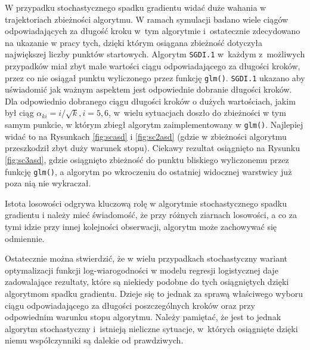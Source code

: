 W przypadku stochastycznego spadku gradientu widać duże wahania w trajektoriach zbieżności algorytmu. W ramach symulacji badano wiele ciągów odpowiadających za długość kroku w~tym algorytmie i~ostatecznie zdecydowano na ukazanie w pracy tych, dzięki którym osiągana zbieżność dotyczyła największej liczby punktów startowych. Algorytm \texttt{SGDI.1} w~każdym z~możliwych przypadków miał zbyt małe wartości ciągu odpowiadającego za długości kroków, przez co nie osiągał punktu wyliczonego przez funkcję \texttt{glm()}. \texttt{SGDI.1} ukazano aby uświadomić jak ważnym aspektem jest odpowiednie dobranie długości kroków. Dla odpowiednio dobranego ciągu długości kroków o dużych wartościach, jakim był ciąg $\alpha_{ki} = i/\sqrt{k}, i = 5, 6$, w~wielu sytuacjach doszło do zbieżności w tym samym punkcie, w którym zbiegł algorytm zaimplementowany w \texttt{glm()}. Najlepiej widać to na Rysunkach \ref{fig:scasd} i \ref{fig:sc2asd} (gdzie w zbieżności algorytmu przeszkodził zbyt duży warunek stopu). Ciekawy rezultat osiągnięto na Rysunku \ref{fig:sc3asd}, gdzie osiągnięto zbieżność do punktu bliskiego wyliczonemu przez funkcję \texttt{glm()}, a algorytm po wkroczeniu do ostatniej widocznej warstwicy już poza nią nie wykraczał. 

Istota losowości odgrywa kluczową rolę w algorytmie stochastycznego spadku gradientu i należy mieć świadomość, że przy różnych ziarnach losowości, a co za tymi idzie przy innej kolejności obserwacji, algorytm może zachowywać się odmiennie. 

Ostatecznie można stwierdzić, że w wielu przypadkach stochastyczny wariant optymalizacji funkcji log-wiarogodności w modelu regresji logistycznej daje zadowalające rezultaty, które są niekiedy podobne do tych osiągniętych dzięki algorytmom spadku gradientu. Dzieje się to jednak za sprawą właściwego wyboru ciągu odpowiadającego za długości poszczególnych kroków oraz przy odpowiednim warunku stopu algorytmu. Należy pamiętać, że jest to jednak algorytm stochastyczny i~istnieją nieliczne sytuacje, w~których osiągnięte dzięki niemu współczynniki są dalekie od prawdziwych.



